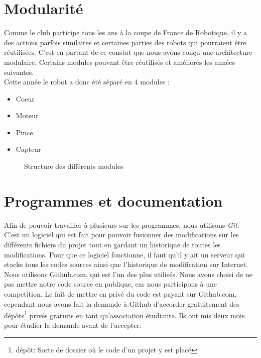 \newpage
\section{Modularité}
Comme le club participe tous les ans à la coupe de France de Robotique, il y a des actions parfois similaires et certaines parties des robots qui pourraient être réutilisées. C'est en partant de ce constat que nous avons conçu une architecture modulaire. Certains modules pouvant être réutilisés et améliorés les années suivantes. \\


Cette année le robot a donc été séparé en 4 modules :

\begin{itemize}
	\item Coeur
	\item Moteur
	\item Pince 
	\item Capteur
\end{itemize}


\begin{figure}[h]
	\centering
	
	\caption{Structure des différents modules}
\end{figure}

\section{Programmes et documentation}
Afin de pouvoir travailler à plusieurs sur les programmes, nous utilisons \textit{Git}. C'est un logiciel qui est fait pour pouvoir fusionner des modifications sur les différents fichiers du projet tout en gardant un historique de toutes les modifications. Pour que ce logiciel fonctionne, il faut qu'il y ait un serveur qui stocke tous les codes sources ainsi que l'historique de modification sur Internet.\\

Nous utilisons Github.com, qui est l'un des plus utilisés. Nous avons choisi de ne pas mettre notre code source en publique, car nous participons à une competition. Le fait de mettre en privé du code est payant sur Github.com, cependant nous avons fait la demande à Github d'accorder gratuitement des dépôts\footnote{dépôt: Sorte de dossier où le code d'un projet y est placé}  privés gratuits en tant qu'association étudiante. Ils ont mis deux mois pour étudier la demande avant de l'accepter.\\

\newpage

